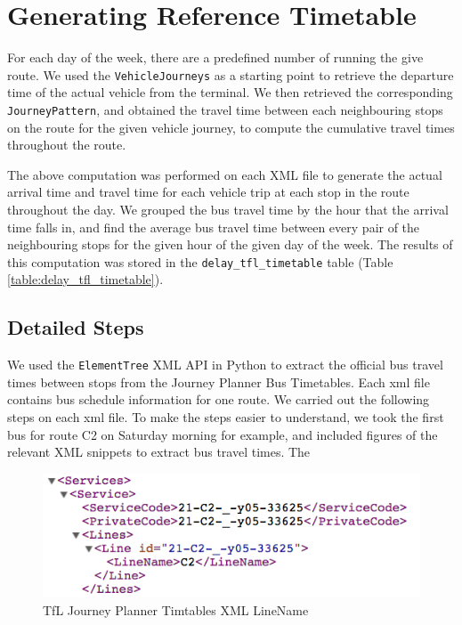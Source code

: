 \section{Generating Reference Timetable}
\label{sec: official_tfl_timetable}
For each day of the week, there are a predefined number of running the give route. We used the \texttt{VehicleJourneys} as a starting point to retrieve the departure time of the actual vehicle from the terminal. We then retrieved the corresponding \texttt{JourneyPattern}, and obtained the travel time between each neighbouring stops on the route for the given vehicle journey, to compute the cumulative travel times throughout the route.

The above computation was performed on each XML file to generate the actual arrival time and travel time for each vehicle trip at each stop in the route throughout the day. We grouped the bus travel time by the hour that the arrival time falls in, and find the average bus travel time between every pair of the neighbouring stops for the given hour of the given day of the week. The results of this computation was stored in the \texttt{delay\_tfl\_timetable} table (Table \ref{table:delay_tfl_timetable}).

\subsection{Detailed Steps}

\par We used the \texttt{ElementTree} XML API in Python \cite{elementtree} to extract the official bus travel times between stops from the Journey Planner Bus Timetables\cite{open_data_feeds_description}. Each \acrshort{xml} file contains bus schedule information for one route. We carried out the following steps on each \acrshort{xml} file. To make the steps easier to understand, we took the first bus for route C2 on Saturday morning for example, and included figures of the relevant XML snippets to extract bus travel times. The

\begin{figure}
\centering
\includegraphics[width=\textwidth]{figures/xml_linename.png}
\caption{\label{fig:xml_linename} TfL Journey Planner Timtables XML LineName}
\end{figure}

